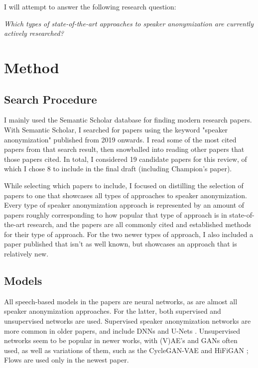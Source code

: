 \documentclass{Interspeech2024}
\begin{document}
I will attempt to answer the following research question:
\begin{displayquote}
    \textit{Which types of state-of-the-art approaches to speaker anonymization are currently actively researched?}
\end{displayquote}

\section{Method}
\subsection{Search Procedure}
I mainly used the Semantic Scholar database for finding modern research papers.
With Semantic Scholar, I searched for papers using the keyword "speaker anonymization" published from 2019 onwards.
I read some of the most cited papers from that search result, then snowballed into reading other papers that those papers cited.
In total, I considered 19 candidate papers for this review, of which I chose 8 to include in the final draft (including Champion's \cite{champion_2023_thesis} paper).

While selecting which papers to include, I focused on distilling the selection of papers to one that showcases all types of approaches to speaker anonymization.
Every type of speaker anonymization approach is represented by an amount of papers roughly corresponding to how popular that type of approach is in state-of-the-art research, and the papers are all commonly cited and established methods for their type of approach.
For the two newer types of approach, I also included a paper published that isn't as well known, but showcases an approach that is relatively new.

\subsection{Models}
All speech-based models in the papers are neural networks, as are almost all speaker anonymization approaches.
For the latter, both supervised and unsupervised networks are used.
Supervised speaker anonymization networks are more common in older papers, and include DNNs and U-Nets \cite{ronneberger_2015_u_net}.
Unsupervised networks seem to be popular in newer works, with (V)AE's \cite{kingma_2013_auto-encoding} and GANs \cite{goodfellow_2014_generative} often used, as well as variations of them, such as the CycleGAN-VAE \cite{zhu_2017_cyclegan_vae} and HiFiGAN \cite{kong_2020_hifi_gan}; Flows \cite{rezende_2015_flows} are used only in the newest paper.
\end{document}
